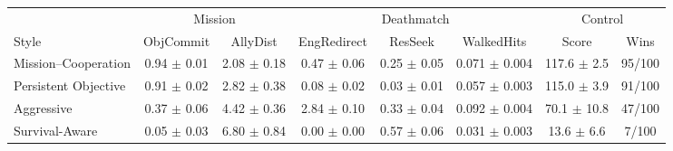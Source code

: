 \begin{tabular}{lccccccc}
\toprule
 & \multicolumn{2}{c}{Mission} & \multicolumn{3}{c}{Deathmatch} & \multicolumn{2}{c}{Control} \\
\cmidrule(lr){2-3}\cmidrule(lr){4-6}\cmidrule(lr){7-8}
Style & ObjCommit & AllyDist & EngRedirect & ResSeek & WalkedHits & Score & Wins \\
\midrule
Mission--Cooperation & 0.94 $\pm$ 0.01 & 2.08 $\pm$ 0.18 & 0.47 $\pm$ 0.06 & 0.25 $\pm$ 0.05 & 0.071 $\pm$ 0.004 & 117.6 $\pm$ 2.5 & 95/100 \\
Persistent Objective & 0.91 $\pm$ 0.02 & 2.82 $\pm$ 0.38 & 0.08 $\pm$ 0.02 & 0.03 $\pm$ 0.01 & 0.057 $\pm$ 0.003 & 115.0 $\pm$ 3.9 & 91/100 \\
Aggressive & 0.37 $\pm$ 0.06 & 4.42 $\pm$ 0.36 & 2.84 $\pm$ 0.10 & 0.33 $\pm$ 0.04 & 0.092 $\pm$ 0.004 & 70.1 $\pm$ 10.8 & 47/100 \\
Survival-Aware & 0.05 $\pm$ 0.03 & 6.80 $\pm$ 0.84 & 0.00 $\pm$ 0.00 & 0.57 $\pm$ 0.06 & 0.031 $\pm$ 0.003 & 13.6 $\pm$ 6.6 & 7/100 \\
\bottomrule
\end{tabular}

